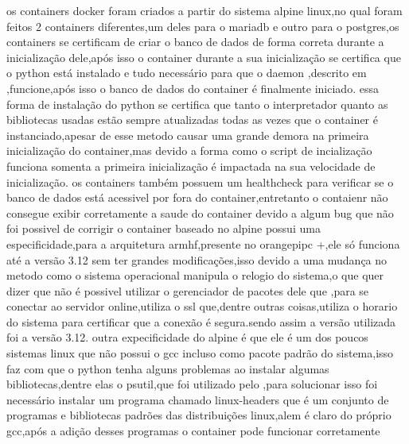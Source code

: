 \documentclass[
	12pt,				%
	openright,			%
	oneside,			%
	a4paper,			%
	english,			%
	french,				%
	spanish,			%
	brazil,				%
	]{abntex2}
\begin{document}
os containers docker foram criados a partir do sistema alpine linux,no qual foram feitos 2 containers diferentes,um deles para o mariadb e outro para o postgres,os containers se certificam de criar o banco de dados de forma correta durante a inicialização dele,após isso o container durante a sua inicialização se certifica que o python está instalado e tudo necessário para que o daemon ,descrito em ,funcione,após isso o banco de dados do container é finalmente iniciado.
essa forma de instalação do python se certifica que tanto o interpretador quanto as bibliotecas usadas estão sempre atualizadas todas as vezes que o container é instanciado,apesar de esse metodo causar uma grande demora na primeira inicialização do container,mas devido a forma como o script de incialização funciona somenta a primeira inicialização é impactada na sua velocidade de inicialização.
os containers também possuem um healthcheck para verificar se o banco de dados está acessivel por fora do container,entretanto o contaienr não consegue exibir corretamente a saude do container devido a algum bug que não foi possivel de corrigir
o container baseado no alpine possui uma especificidade,para a arquitetura armhf,presente no orangepipc +,ele só funciona até a versão 3.12 sem ter grandes modificações,isso devido a uma mudança no metodo como o sistema operacional manipula o relogio do sistema,o que quer dizer que não é possivel utilizar o gerenciador de pacotes dele que ,para se conectar ao servidor online,utiliza o ssl que,dentre outras coisas,utiliza o horario do sistema para certificar que a conexão é segura.sendo assim a versão utilizada foi a versão 3.12.
outra expecificidade do alpine é que ele é um dos poucos sistemas linux que não possui o gcc incluso como pacote padrão do sistema,isso faz com que o python tenha alguns problemas ao instalar algumas bibliotecas,dentre elas o psutil,que foi utilizado pelo ,para solucionar isso foi necessário instalar um programa chamado linux-headers que é um conjunto de programas e bibliotecas padrões das distribuições linux,alem é claro do próprio gcc,após a adição desses programas o container pode funcionar corretamente
\end{document}
